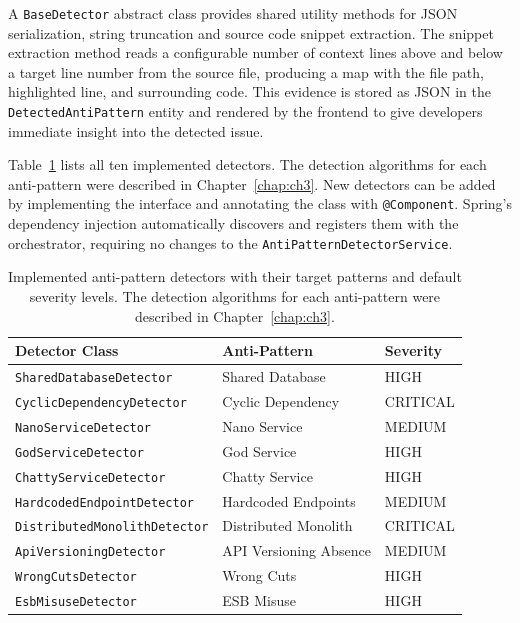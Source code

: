 A \texttt{BaseDetector} abstract class provides shared utility methods for JSON serialization, string truncation and source code snippet extraction. The snippet extraction method reads a configurable number of context lines above and below a target line number from the source file, producing a map with the file path, highlighted line, and surrounding code. This evidence is stored as JSON in the \texttt{De\-tec\-tedAn\-tiPa\-ttern} entity and rendered by the frontend to give developers immediate insight into the detected issue.

Table~\ref{tab:detectors} lists all ten implemented detectors. The detection algorithms for each anti-pattern were described in Chapter~\ref{chap:ch3}. New detectors can be added by implementing the interface and annotating the class with \texttt{@Component}. Spring's dependency injection automatically discovers and registers them with the orchestrator, requiring no changes to the \texttt{AntiPatternDetectorService}.

\begin{table}[htbp]
    \centering
    \footnotesize
    \begin{tabular}{|l|l|l|}
        \hline
        \textbf{Detector Class}              & \textbf{Anti-Pattern}  & \textbf{Severity} \\
        \hline\hline
        \texttt{SharedDatabaseDetector}      & Shared Database        & HIGH              \\
        \hline
        \texttt{CyclicDependencyDetector}    & Cyclic Dependency      & CRITICAL          \\
        \hline
        \texttt{NanoServiceDetector}         & Nano Service           & MEDIUM            \\
        \hline
        \texttt{GodServiceDetector}          & God Service            & HIGH              \\
        \hline
        \texttt{ChattyServiceDetector}       & Chatty Service         & HIGH              \\
        \hline
        \texttt{HardcodedEndpointDetector}   & Hardcoded Endpoints    & MEDIUM            \\
        \hline
        \texttt{DistributedMonolithDetector} & Distributed Monolith   & CRITICAL          \\
        \hline
        \texttt{ApiVersioningDetector}       & API Versioning Absence & MEDIUM            \\
        \hline
        \texttt{WrongCutsDetector}           & Wrong Cuts             & HIGH               \\
        \hline
        \texttt{EsbMisuseDetector}           & ESB Misuse             & HIGH                \\
        \hline
    \end{tabular}
    \caption{Implemented anti-pattern detectors with their target patterns and default severity levels. The detection algorithms for each anti-pattern were described in Chapter~\ref{chap:ch3}.}
    \label{tab:detectors}
\end{table}

